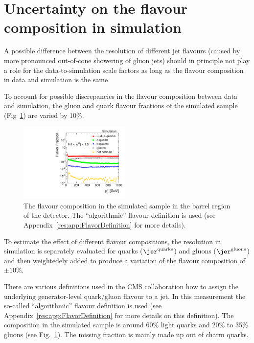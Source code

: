 \section*{Uncertainty on the flavour composition in simulation}
A possible difference between the resolution of different jet flavours (\eg caused by more pronounced out-of-cone showering of gluon jets) should in principle not play a role for the data-to-simulation scale factors \rhores as long as the flavour composition in data and simulation is the same.

To account for possible discrepancies in the flavour composition between data and simulation, the gluon and quark flavour fractions of the simulated sample (Fig~\ref{res:fig:FlavorFraction}) are varied by 10\%.
\begin{figure}[!b]
  \centering
      \includegraphics[width=0.49\textwidth]{figures/resolution/systematicUncertainties/flavorFraction_barrel_algo.pdf}
  \caption{The flavour composition in the simulated \GAMJET sample in the barrel region of the detector. The ``algorithmic'' flavour definition is used (see Appendix~\ref{res:app:FlavorDefinition} for more details).}  
  \label{res:fig:FlavorFraction}
\end{figure}
To estimate the effect of different flavour compositions, the resolution in simulation is separately evaluated for quarks ($\jer^\text{quarks}$) and gluons ($\jer^\text{gluons}$) and then weightedely added to produce a variation of the flavour composition of $\pm 10\%$. 

There are various definitions used in the CMS collaboration how to assign the underlying generator-level quark/gluon flavour to a jet.
In this measurement the so-called ``algorithmic'' flavour definition is used (see Appendix~\ref{res:app:FlavorDefinition} for more details on this definition).
The composition in the simulated \pythia \GAMJET sample is around 60\% light quarks and 20\% to 35\% gluons (see Fig.~\ref{res:fig:FlavorFraction}). 
The missing fraction is mainly made up out of charm quarks. 


